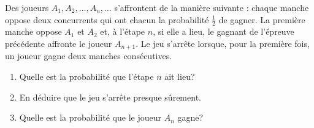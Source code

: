 \documentclass[../PolyS4.tex]{subfiles}
\begin{document}
Des joueurs $A_1,A_2,\dots,A_n,\dots$ s'affrontent de la manière suivante : chaque manche oppose deux concurrents qui ont chacun la probabilité $\frac 12$ de gagner. La première manche oppose $A_1$ et $A_2$ et, à l'étape $n$, si elle a lieu, le gagnant de l'épreuve précédente affronte le joueur $A_{n+1}$. Le jeu s'arrête lorsque, pour la première fois, un joueur gagne deux manches consécutives. 
\begin{enumerate}
\item Quelle est la probabilité que l'étape $n$ ait lieu?
\item En déduire que le jeu s'arrête presque sûrement.
\item Quelle est la probabilité que le joueur $A_n$ gagne?\\

\end{enumerate}


\end{document}
